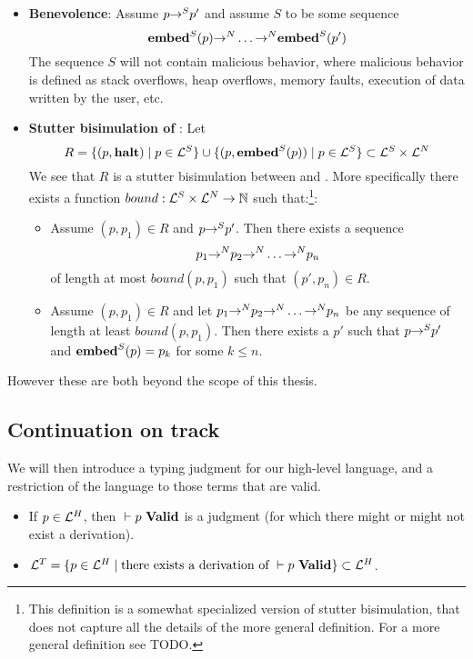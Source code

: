 \begin{itemize}
\item \textbf{Benevolence}: Assume $p {{->}^S} p'$ and assume $S$ to be some
  sequence $${{{\mathbf{embed}}}^S}(p) {{->}^N} \dots {\ensuremath{{->}^N}}
  {\ensuremath{{{\mathbf{embed}}}^S}}(p')$$ The sequence $S$ will not contain malicious behavior,
  where malicious behavior is defined as stack overflows, heap overflows, memory
  faults, execution of data written by the user, etc.

\item \textbf{Stutter bisimulation of \simple\embed}: Let
  $$R = \{(p, \mathbf{halt}) \mid p \in {\ensuremath{{{\mathcal{L}}}^S}}\} \cup \{(p,
  {{{\mathbf{embed}}}^S}(p)) \mid p \in {\ensuremath{{{\mathcal{L}}}^S}}\} \subset {\ensuremath{{{\mathcal{L}}}^S}} \times
  {\ensuremath{{{\mathcal{L}}}^N}}$$ We see that $R$ is a stutter bisimulation between \simple{->}
  and \high{->}. More specifically there exists a function
  $bound : {{{\mathcal{L}}}^S} \times {\ensuremath{{{\mathcal{L}}}^N}} \to \mathbb{N}$ such
  that:\footnote{This definition is a somewhat specialized version of stutter
    bisimulation, that does not capture all the details of the more general
    definition. For a more general definition see TODO.}:

  \begin{itemize}
  \item Assume $(p, p_1) \in R$ and $p {{->}^S} p'$. Then there exists a
    sequence $$p_1 {{->}^N} p_2 {{->}^N} \dots {\ensuremath{{->}^N}} p_n$$ of length
    at most $bound(p, p_1)$ such that $(p', p_n) \in R$.
  \item Assume $(p, p_1) \in R$ and let
    $p_1 {{->}^N} p_2 {{->}^N} \dots {\ensuremath{{->}^N}} p_n$ be any sequence of
    length at least $bound(p, p_1)$. Then there exists a $p'$ such that
    $p {{->}^S} p'$ and ${{{\mathbf{embed}}}^S}(p) = p_k$ for some $k \leq n$.
  \end{itemize}
\end{itemize}

However these are both beyond the scope of this thesis.

\subsection{Continuation on track}

We will then introduce a typing judgment for our high-level language, and a
restriction of the language to those terms that are valid.

\begin{itemize}
\item If $p \in {\ensuremath{{{\mathcal{L}}}^H}}$, then ${} |- {p}\ \mathbf{Valid}$ is a judgment (for which there
  might or might not exist a derivation).
\item ${{{\mathcal{L}}}^T} = \{p \in {\ensuremath{{{\mathcal{L}}}^H}} \mid \text{there exists a derivation of ${} |- {p}\ \mathbf{Valid}$}\} \subset {\ensuremath{{{\mathcal{L}}}^H}}$.
\end{itemize}

